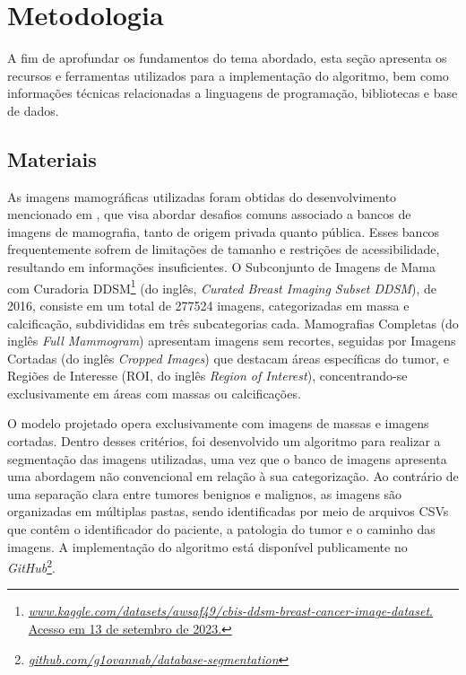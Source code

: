 

\section{\esp Metodologia} \label{metodologia}
A fim de aprofundar os fundamentos do tema abordado, esta seção apresenta os recursos e ferramentas utilizados para a implementação do algoritmo, bem como informações técnicas relacionadas a linguagens de programação, bibliotecas e base de dados.



\subsection{\esp Materiais} \label{materiais}

As imagens mamográficas utilizadas foram obtidas do desenvolvimento mencionado em , que visa abordar desafios comuns associado a bancos de imagens de mamografia, tanto de origem privada quanto pública. Esses bancos frequentemente sofrem de limitações de tamanho e restrições de acessibilidade, resultando em informações insuficientes. O Subconjunto de Imagens de Mama com Curadoria DDSM\footnote{\href{https://www.kaggle.com/datasets/awsaf49/cbis-ddsm-breast-cancer-image-dataset}{\textit{www.kaggle.com/datasets/awsaf49/cbis-ddsm-breast-cancer-image-dataset}. Acesso em 13 de setembro de 2023.}} (do inglês, \textit{Curated Breast Imaging Subset DDSM}), de 2016, consiste em um total de 277524 imagens, categorizadas em massa e calcificação, subdivididas em três subcategorias cada. Mamografias Completas (do inglês \textit{Full Mammogram}) apresentam imagens sem recortes, seguidas por Imagens Cortadas (do inglês \textit{Cropped Images}) que destacam áreas específicas do tumor, e Regiões de Interesse (ROI, do inglês \textit{Region of Interest}), concentrando-se exclusivamente em áreas com massas ou calcificações.

O modelo projetado opera exclusivamente com imagens de massas e imagens cortadas. Dentro desses critérios, foi desenvolvido um algoritmo para realizar a segmentação das imagens utilizadas, uma vez que o banco de imagens apresenta uma abordagem não convencional em relação à sua categorização. Ao contrário de uma separação clara entre tumores benignos e malignos, as imagens são organizadas em múltiplas pastas, sendo identificadas por meio de arquivos CSVs que contêm o identificador do paciente, a patologia do tumor e o caminho das imagens. A implementação do algoritmo está disponível publicamente no \textit{GitHub}\footnote{\href{https://github.com/g1ovannab/database-segmentation}{\textit{github.com/g1ovannab/database-segmentation}}}.

